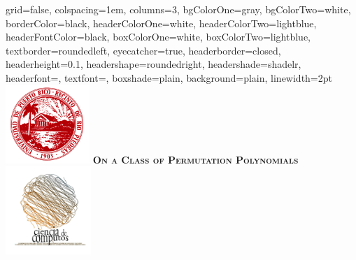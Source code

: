 \documentclass[landscape,final,paperwidth=48in,paperheight=38in]{baposter}
\begin{document}
\begin{poster}%
  {
  grid=false,
  colspacing=1em,
  columns=3,
  bgColorOne=gray,
  bgColorTwo=white,
  borderColor=black,
  headerColorOne=white,
  headerColorTwo=lightblue,
  headerFontColor=black,
  boxColorOne=white,
  boxColorTwo=lightblue,
  textborder=roundedleft,
  eyecatcher=true,
  headerborder=closed,
  headerheight=0.1\textheight,
  headershape=roundedright,
  headershade=shadelr,
  headerfont=\Large\textsc, %
  textfont=\large{\setlength{\parindent}{1.5em}},
  boxshade=plain,
  background=plain,
  linewidth=2pt
  }
  {\includegraphics[height=8em,keepaspectratio=true]{images/logo_uprrp}} 
  {\bf\textsc{On a Class of Permutation Polynomials}\vspace{0.1em}}
  {}
  {%
    \includegraphics[height=9em,keepaspectratio=true]{images/logo_ccom}
  }

    \newcommand{\colouredcircle}{%
      \tikz{\useasboundingbox (-0.2em,-0.32em) rectangle(0.2em,0.32em); \draw[draw=black,fill=lightblue,line width=0.03em] (0,0) circle(0.18em);}}


\end{poster}
\end{document}
